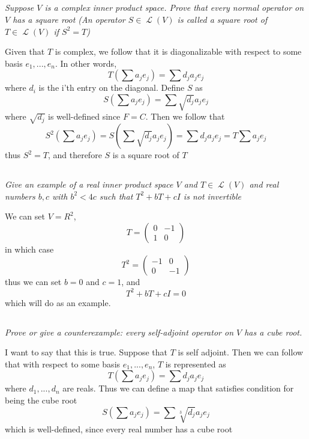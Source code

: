 \documentclass[11pt,oneside,titlepage]{book}
\DeclareMathOperator \map {\mathcal {L}}
\begin{document}
\subsection{}

\textit{Suppose $V$ is a complex inner product space. Prove that every normal operator on $V$
  has a square root (An operator $S \in  \map(V)$ is called a square root of $T \in \map(V)$
  if $S^2 = T$)}

Given that $T$ is complex, we follow that it is diagonalizable with respect to some
basis $e_1, ..., e_n$. In other words,
$$T(\sum{ a_j e_j}) = \sum{ d_j a_j e_j}$$
where $d_i$ is the i'th entry on the diagonal. Define $S$ as
$$S(\sum {a_j e_j}) = \sum {\sqrt{d_j} a_j e_j}$$
where $\sqrt{d_j}$ is well-defined since $F = C$.
Then we follow that
$$S^2 (\sum {a_j e_j}) = S(\sum {\sqrt{d_j} a_j e_j}) = \sum {d_j a_j e_j} = T{\sum {a_j e_j}}$$
thus $S^2 = T$, and therefore $S$ is a square root of $T$

\subsection{}

\textit{Give an example of a real inner product space $V$ and $T \in \map(V)$ and real
  numbers $b, c$ with $b^2 < 4c$ such that $T^2 + bT + cI$ is not invertible}

We can set $V = R^2$,
$$T =
\begin{pmatrix}
  0 & -1 \\
  1 & 0
\end{pmatrix}
$$
in which case
$$T^2 = 
\begin{pmatrix}
  -1 & 0 \\
  0 & -1
\end{pmatrix}
$$
thus we can set $b = 0$ and $c = 1$, and
$$T^2 + bT + cI = 0$$
which will do as an example.

\subsection{}

\textit{Prove or give a counterexample: every self-adjoint operator on $V$ has a cube root.}

I want to say that this is true. Suppose that $T$ is self adjoint. Then we can follow that
with respect to some basis $e_1, ..., e_n$, $T$ is represented as
$$T (\sum{a_j e_j}) = \sum d_j a_j e_j$$
where $d_1, ..., d_n$ are reals.
Thus we can define a map that satisfies condition for being the cube root
$$S (\sum{a_j e_j}) = \sum \sqrt[3]{d_j} a_j e_j$$
which is well-defined, since every real number has a cube root
\end{document}

